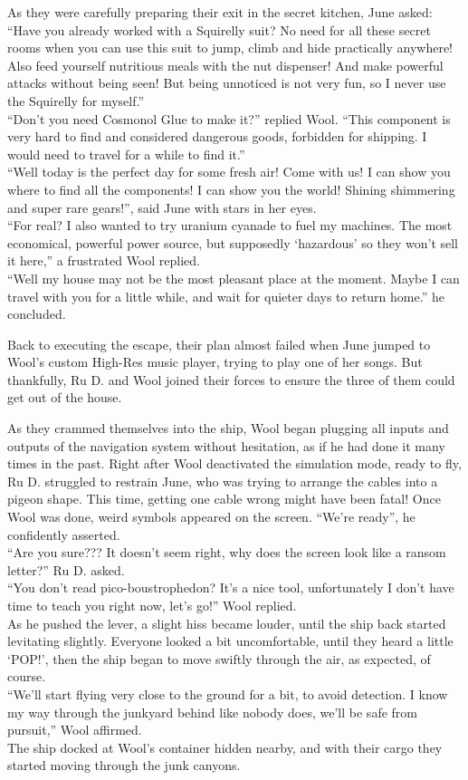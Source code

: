 \clearpage  %
As they were carefully preparing their exit in the secret kitchen, June asked:\\
``Have you already worked with a Squirelly suit? No need for all these secret rooms when you can use this suit to jump, climb and hide practically anywhere! Also feed yourself nutritious meals with the nut dispenser! And make powerful attacks without being seen! But being unnoticed is not very fun, so I never use the Squirelly for myself.''\\
``Don’t you need Cosmonol Glue to make it?'' replied Wool. ``This component is very hard to find and considered dangerous goods, forbidden for shipping. I would need to travel for a while to find it.''\\
``Well today is the perfect day for some fresh air! Come with us! I can show you where to find all the components! I can show you the world! Shining shimmering and super rare gears!'', said June with stars in her eyes.\\
``For real? I also wanted to try uranium cyanade to fuel my machines. The most economical, powerful power source, but supposedly ‘hazardous’ so they won’t sell it here,'' a frustrated Wool replied.\\
``Well my house may not be the most pleasant place at the moment. Maybe I can travel with you for a little while, and wait for quieter days to return home.'' he concluded.

Back to executing the escape, their plan almost failed when June jumped to Wool's custom High-Res music player, trying to play one of her songs. But thankfully, Ru D. and Wool joined their forces to ensure the three of them could get out of the house.


As they crammed themselves into the ship, Wool began plugging all inputs and outputs of the navigation system without hesitation, as if he had done it many times in the past.
Right after Wool deactivated the simulation mode, ready to fly, Ru D. struggled to restrain June, who was trying to arrange the cables into a pigeon shape. This time, getting one cable wrong might have been fatal! 
\clearpage  %
Once Wool was done, weird symbols appeared on the screen. ``We're ready'', he confidently asserted.\\
``Are you sure??? It doesn't seem right, why does the screen look like a ransom letter?'' Ru D. asked.\\
``You don't read pico-boustrophedon? It's a nice tool, unfortunately I don't have time to teach you right now, let's go!'' Wool replied.\\
As he pushed the lever, a slight hiss became louder, until the ship back started levitating slightly. Everyone looked a bit uncomfortable, until they heard a little `POP!', then the ship began to move swiftly through the air, as expected, of course.\\
``We'll start flying very close to the ground for a bit, to avoid detection. I know my way through the junkyard behind like nobody does, we'll be safe from pursuit,'' Wool affirmed.\\
The ship docked at Wool's container hidden nearby, and with their cargo they started moving through the junk canyons.

